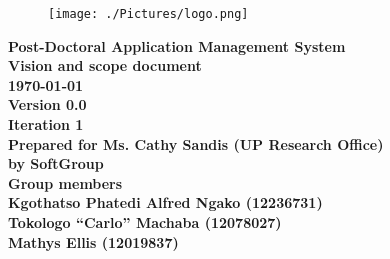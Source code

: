 \documentclass[12pt]{article}
\newcommand{\Title}{Vision and scope document} %
\newcommand{\ssr}{Soft\color{green}{Serve }\color{black}}
\newcommand{\version}{0.0}
\newcommand{\iteration}{1}
\newcommand{\client}{Ms. Cathy Sandis (UP Research Office)}
\newcommand{\project}{Post-Doctoral Application Management System}
\begin{document}
\vspace{4em}

\begin{center}%

\begin{figure}[ht!]
\centering
\texttt{[image: ./Pictures/logo.png]}
\end{figure}
\LARGE \bf \project \\[1em]
\LARGE \bf \Title \\[0.25em]
\large \bf \today\\
\bf Version \version\\
\bf Iteration \iteration\\[0.5em]
\Large \bf Prepared for \client\\
\Large \bf by
\Large {\bf \ssr Group }\\[0.5em]
\LARGE {\bf Group members}\\[0.25em]
\large
Kgothatso Phatedi Alfred Ngako (12236731) \\[0.5em]
Tokologo “Carlo” Machaba (12078027) \\[0.5em]
Mathys Ellis (12019837) \\[8em]

\end{center}%

\end{document}
